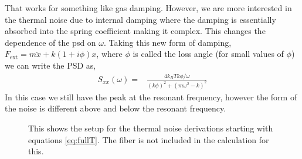 That works for something like gas damping. However, we are more interested in
the thermal noise due to internal damping where the damping is essentially
absorbed into the spring coefficient making it complex. This changes the
dependence of the \ac{psd} on $\omega$. Taking this new form of damping,
$F_{\mathrm{ext}} = m\ddot{x} + k(1+i\phi)x$, where $\phi$ is called the
loss angle (for small values of $\phi$) we can write the PSD as,
\begin{align}
S_{xx}(\omega) = & \frac{4 k_B T k \phi / \omega}{(k \phi)^2 +
    (m \omega^2 - k)^2}
\end{align}
In this case we still have the peak at the resonant frequency, however the form
of the noise is different above and below the resonant frequency.

\begin{figure}
\centering
  \caption[Sketch of Thermal Noise Calculation]{
    This shows the setup for the thermal noise derivations starting with
    equations \ref{eq:fullT}.
    The fiber is not included in the calculation for this.
    }
  \label{fig:tnoisesketch}
\end{figure}


